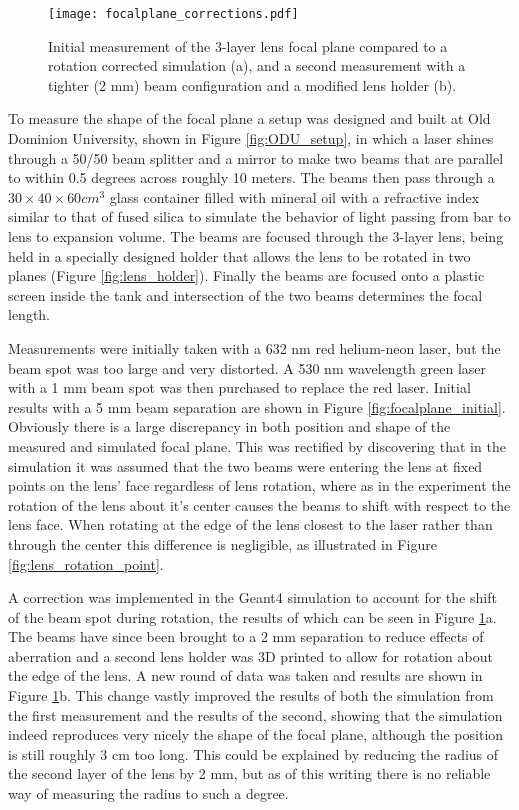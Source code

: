 \begin{figure}[ht]
	\centering
	\texttt{[image: focalplane\_corrections.pdf]}
	\caption{Initial measurement of the 3-layer lens focal plane compared to a rotation corrected simulation (a), and a second measurement with a tighter (2 mm) beam configuration and a modified lens holder (b).}
	\label{fig:focalplane_corrections}
\end{figure}

To measure the shape of the focal plane a setup was designed and built at Old Dominion University, shown in Figure \ref{fig:ODU_setup}, in which a laser shines through a 50/50 beam splitter and a mirror to make two beams that are parallel to within 0.5 degrees across roughly 10 meters. The beams then pass through a $30\times40\times60\unit{cm}^3$ glass container filled with mineral oil with a refractive index similar to that of fused silica to simulate the behavior of light passing from bar to lens to expansion volume. The beams are focused through the 3-layer lens, being held in a specially designed holder that allows the lens to be rotated in two planes (Figure \ref{fig:lens_holder}). Finally the beams are focused onto a plastic screen inside the tank and intersection of the two beams determines the focal length.

Measurements were initially taken with a 632 nm red helium-neon laser, but the beam spot was too large and very distorted. A 530 nm wavelength green laser with a 1 mm beam spot was then purchased to replace the red laser. Initial results with a 5 mm beam separation are shown in Figure \ref{fig:focalplane_initial}. Obviously there is a large discrepancy in both position and shape of the measured and simulated focal plane. This was rectified by discovering that in the simulation it was assumed that the two beams were entering the lens at fixed points on the lens' face regardless of lens rotation, where as in the experiment the rotation of the lens about it's center causes the beams to shift with respect to the lens face. When rotating at the edge of the lens closest to the laser rather than through the center this difference is negligible, as illustrated in Figure \ref{fig:lens_rotation_point}.

A correction was implemented in the Geant4 simulation to account for the shift of the beam spot during rotation, the results of which can be seen in Figure \ref{fig:focalplane_corrections}a. The beams have since been brought to a 2 mm separation to reduce effects of aberration and a second lens holder was 3D printed to allow for rotation about the edge of the lens. A new round of data was taken and results are shown in Figure \ref{fig:focalplane_corrections}b. This change vastly improved the results of both the simulation from the first measurement and the results of the second, showing that the simulation indeed reproduces very nicely the shape of the focal plane, although the position is still roughly 3 cm too long. This could be explained by reducing the radius of the second layer of the lens by 2 mm, but as of this writing there is no reliable way of measuring the radius to such a degree.

